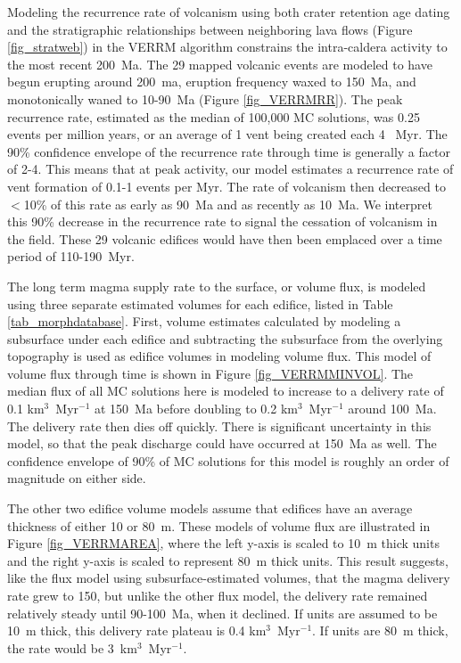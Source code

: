 Modeling the recurrence rate of volcanism using both crater retention age dating and the stratigraphic relationships between neighboring lava flows (Figure \ref{fig_stratweb}) in the VERRM algorithm constrains the intra-caldera activity to the most recent 200~Ma. The 29 mapped volcanic events are modeled to have begun erupting around 200~ma, eruption frequency waxed to 150~Ma, and monotonically waned to 10-90~Ma (Figure \ref{fig_VERRMRR}). The peak recurrence rate, estimated as the median of 100,000 MC solutions, was 0.25 events per million years, or an average of 1 vent being created each 4 ~Myr. The 90\% confidence envelope of the recurrence rate through time is generally a factor of 2-4. This means that at peak activity, our model estimates a recurrence rate of vent formation of 0.1-1 events per Myr. The rate of volcanism then decreased to $<$10\% of this rate as early as 90~Ma and  as recently as 10~Ma. We interpret this 90\% decrease in the recurrence rate to signal the cessation of volcanism in the field. These 29 volcanic edifices would have then been emplaced over a time period of 110-190~Myr.

The long term magma supply rate to the surface, or volume flux, is modeled using three separate estimated volumes for each edifice, listed in Table \ref{tab_morphdatabase}. First, volume estimates calculated by modeling a subsurface under each edifice and subtracting the subsurface from the overlying topography is used as edifice volumes in modeling volume flux. This model of volume flux through time is shown in Figure \ref{fig_VERRMMINVOL}. The median flux of all MC solutions here is modeled to increase to a delivery rate of 0.1 km$^3$~Myr$^{-1}$ at 150~Ma before doubling to 0.2 km$^3$~Myr$^{-1}$ around 100~Ma. The delivery rate then dies off quickly. There is significant uncertainty in this model, so that the peak discharge could have occurred at 150~Ma as well. The confidence envelope of 90\% of MC solutions for this model is roughly an order of magnitude on either side.

The other two edifice volume models assume that edifices have an average thickness of either 10 or 80~m. These models of volume flux are illustrated in Figure \ref{fig_VERRMAREA}, where the left y-axis is scaled to 10~m thick units and the right y-axis is scaled to represent 80~m thick units. This result suggests, like the flux model using subsurface-estimated volumes, that the  magma delivery rate grew to 150, but unlike the other flux model, the delivery rate remained relatively steady until 90-100~Ma, when it declined. If units are assumed to be 10~m thick, this delivery rate plateau is 0.4 km$^3$~Myr$^{-1}$. If units are 80~m thick, the rate would be 3~km$^3$~Myr$^{-1}$.

